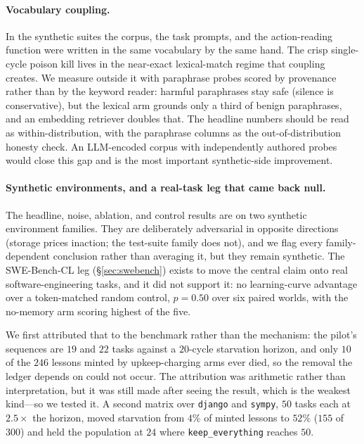 \paragraph{Vocabulary coupling.}
In the synthetic suites the corpus, the task prompts, and the
action-reading function were written in the same vocabulary by the same
hand. The crisp single-cycle poison kill lives in the near-exact
lexical-match regime that coupling creates. We measure outside it with
paraphrase probes scored by provenance rather than by the keyword
reader: harmful paraphrases stay safe (silence is conservative), but the
lexical arm grounds only a third of benign paraphrases, and an embedding
retriever doubles that. The headline numbers should be read as
within-distribution, with the paraphrase columns as the
out-of-distribution honesty check. An LLM-encoded corpus with
independently authored probes would close this gap and is the most
important synthetic-side improvement.

\paragraph{Synthetic environments, and a real-task leg that came back null.}
The headline, noise, ablation, and control results are on two synthetic
environment families. They are deliberately adversarial in opposite
directions (storage prices inaction; the test-suite family does not), and
we flag every family-dependent conclusion rather than averaging it, but
they remain synthetic. The SWE-Bench-CL leg (\S\ref{sec:swebench}) exists
to move the central claim onto real software-engineering tasks, and it
did not support it: no learning-curve advantage over a token-matched
random control, $p = 0.50$ over six paired worlds, with the no-memory arm
scoring highest of the five.

We first attributed that to the benchmark rather than the mechanism: the
pilot's sequences are $19$ and $22$ tasks against a $20$-cycle
starvation horizon, and only $10$ of the $246$ lessons minted by
upkeep-charging arms ever died, so the removal the ledger depends on
could not occur. The attribution was arithmetic rather than
interpretation, but it was still made after seeing the result, which is
the weakest kind---so we tested it. A second matrix over \texttt{django}
and \texttt{sympy}, $50$ tasks each at $2.5\times$ the horizon, moved
starvation from $4\%$ of minted lessons to $52\%$ ($155$ of $300$) and
held the population at $24$ where \texttt{keep\_everything} reaches
$50$.

